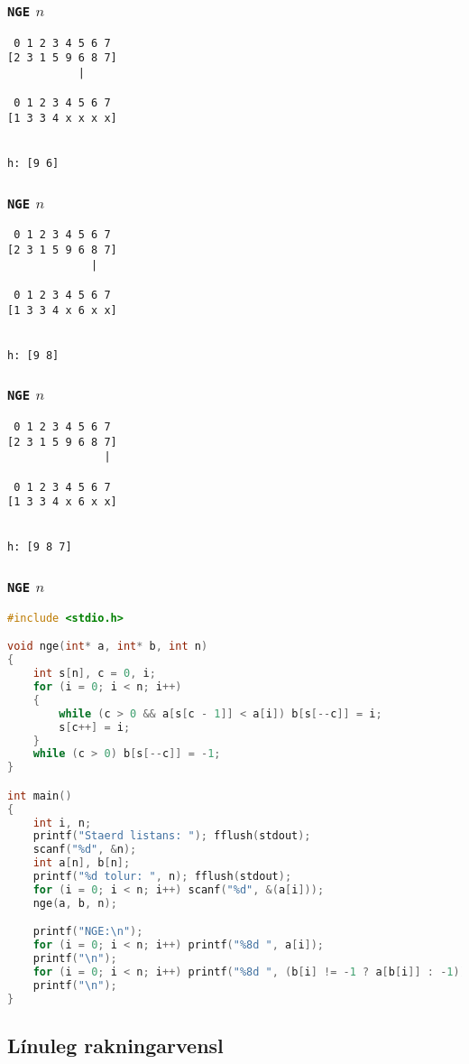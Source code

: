 \documentclass{beamer}
\begin{document}
\begin{frame}[fragile]
	\frametitle{\texttt{NGE} $n$}
\begin{verbatim}
 0 1 2 3 4 5 6 7
[2 3 1 5 9 6 8 7]
           |

 0 1 2 3 4 5 6 7
[1 3 3 4 x x x x]


h: [9 6]
\end{verbatim}
\end{frame}
\addtocounter{framenumber}{-1}

\begin{frame}[fragile]
	\frametitle{\texttt{NGE} $n$}
\begin{verbatim}
 0 1 2 3 4 5 6 7
[2 3 1 5 9 6 8 7]
             |

 0 1 2 3 4 5 6 7
[1 3 3 4 x 6 x x]


h: [9 8]
\end{verbatim}
\end{frame}
\addtocounter{framenumber}{-1}

\begin{frame}[fragile]
	\frametitle{\texttt{NGE} $n$}
\begin{verbatim}
 0 1 2 3 4 5 6 7
[2 3 1 5 9 6 8 7]
               |

 0 1 2 3 4 5 6 7
[1 3 3 4 x 6 x x]


h: [9 8 7]
\end{verbatim}
\end{frame}

\begin{frame}[fragile]
	\frametitle{\texttt{NGE} $n$}
	\tiny
	\begin{lstlisting}[language=C]
#include <stdio.h>

void nge(int* a, int* b, int n)
{
	int s[n], c = 0, i;
	for (i = 0; i < n; i++)
	{
		while (c > 0 && a[s[c - 1]] < a[i]) b[s[--c]] = i;
		s[c++] = i;
	}
	while (c > 0) b[s[--c]] = -1;
}

int main()
{
	int i, n;
	printf("Staerd listans: "); fflush(stdout);
	scanf("%d", &n);
	int a[n], b[n];
	printf("%d tolur: ", n); fflush(stdout);
	for (i = 0; i < n; i++) scanf("%d", &(a[i]));
	nge(a, b, n);

	printf("NGE:\n");
	for (i = 0; i < n; i++) printf("%8d ", a[i]);
	printf("\n");
	for (i = 0; i < n; i++) printf("%8d ", (b[i] != -1 ? a[b[i]] : -1));
	printf("\n");
}
	\end{lstlisting}
\end{frame}

\subsection{Línuleg rakningarvensl}
\end{document}
